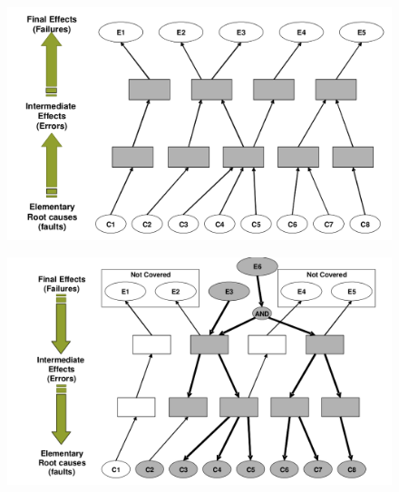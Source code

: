 \begin{figure}[H]
  \centering
  \begin{minipage}{0.49\textwidth}
    \centering
    \includegraphics[width=\textwidth]{images/fmea.png}
    \label{fig:fmea}
  \end{minipage}%
  \begin{minipage}{0.49\textwidth}
    \centering
    \includegraphics[width=\textwidth]{images/fta.png}
    \label{fig:fta}
  \end{minipage}
\end{figure}

